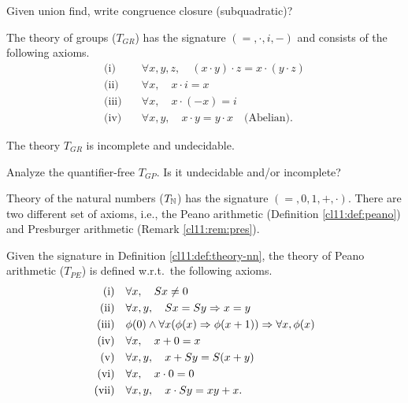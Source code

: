 \begin{exercise}
    Given union find, write congruence closure (subquadratic)? 
\end{exercise}



\begin{definition}[$T_{GR}$]
  The theory of groups ($T_{GR}$) has the signature $(=, \cdot, i, -)$ and consists of the following axioms.
\begin{align*}
\text{(i)} \quad & \forall x,y,z, \quad (x \cdot y) \cdot z = x \cdot (y \cdot z) \\
\text{(ii)} \quad & \forall x, \quad x \cdot i = x \\
\text{(iii)} \quad & \forall x, \quad x \cdot (-x) = i \\
\text{(iv)} \quad & \forall x,y, \quad x \cdot y = y \cdot x \quad \text{(Abelian)}  . 
\end{align*}
\end{definition}

\begin{theorem}
    The theory $T_{GR}$ is incomplete and undecidable. 
\end{theorem}



\begin{exercise}
    Analyze the quantifier-free $T_{GP}$. Is it undecidable and/or incomplete?
\end{exercise}




\begin{definition}[$T_{\NN}$]
\label{cl11:def:theory-nn}
 Theory of the natural numbers ($T_{\NN}$) has the signature $(=, 0, 1, +, \cdot)$. There are two different set of axioms, i.e., the Peano arithmetic (Definition \ref{cl11:def:peano}) and Presburger arithmetic (Remark \ref{cl11:rem:pres}).
\end{definition}





\begin{definition}[$T_{PE}$]
\label{cl11:def:peano}
Given the signature in Definition \ref{cl11:def:theory-nn}, the theory of Peano arithmetic ($T_{PE}$) is defined w.r.t.\ the following axioms. 
 \begin{align*}
\text{(i)} \quad &\forall x, \quad Sx \neq 0 \\
\text{(ii)} \quad &\forall x,y, \quad Sx = Sy \Rightarrow x=y \\
\text{(iii)} \quad&\phi(0) \land \forall x (\phi(x) \Rightarrow \phi(x+1)) \Rightarrow \forall x, \phi(x) \\
\text{(iv)} \quad&\forall x, \quad x + 0 = x \\
\text{(v)} \quad&\forall x,y, \quad x + Sy = S (x+y) \\
\text{(vi)} \quad&\forall x, \quad x \cdot 0 = 0 \\
\text{(vii)} \quad&\forall x,y, \quad x \cdot Sy = xy + x .
 \end{align*}
\end{definition}


